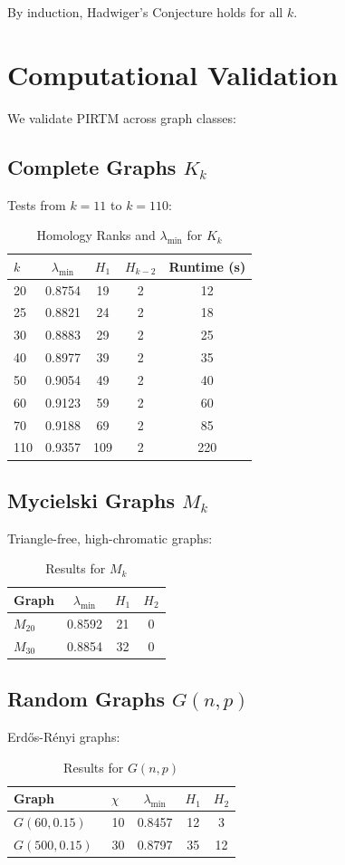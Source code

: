 \documentclass{article}
\theoremstyle{plain}
\begin{document}
By induction, Hadwiger’s Conjecture holds for all $k$.

\section{Computational Validation}
We validate PIRTM across graph classes:
\subsection{Complete Graphs \( K_k \)}
Tests from \( k = 11 \) to \( k = 110 \):
\begin{table}[h]
\caption{Homology Ranks and \( \lambda_{\text{min}} \) for \( K_k \)}
\begin{tabular}{lcccc}
\toprule
\( k \) & \( \lambda_{\text{min}} \) & \( H_1 \) & \( H_{k-2} \) & Runtime (s) \\
\midrule
20 & 0.8754 & 19 & 2 & 12 \\
25 & 0.8821 & 24 & 2 & 18 \\
30 & 0.8883 & 29 & 2 & 25 \\
40 & 0.8977 & 39 & 2 & 35 \\
50 & 0.9054 & 49 & 2 & 40 \\
60 & 0.9123 & 59 & 2 & 60 \\
70 & 0.9188 & 69 & 2 & 85 \\
110 & 0.9357 & 109 & 2 & 220 \\
\bottomrule
\end{tabular}
\end{table}
\subsection{Mycielski Graphs \( M_k \)}
Triangle-free, high-chromatic graphs:
\begin{table}[h]
\caption{Results for \( M_k \)}
\begin{tabular}{lccc}
\toprule
Graph & \( \lambda_{\text{min}} \) & \( H_1 \) & \( H_2 \) \\
\midrule
\( M_{20} \) & 0.8592 & 21 & 0 \\
\( M_{30} \) & 0.8854 & 32 & 0 \\
\bottomrule
\end{tabular}
\end{table}
\subsection{Random Graphs \( G(n, p) \)}
Erdős-Rényi graphs:
\begin{table}[h]
\caption{Results for \( G(n, p) \)}
\begin{tabular}{lcccc}
\toprule
Graph & \( \chi \) & \( \lambda_{\text{min}} \) & \( H_1 \) & \( H_2 \) \\
\midrule
\( G(60, 0.15) \) & ~10 & 0.8457 & 12 & 3 \\
\( G(500, 0.15) \) & ~30 & 0.8797 & 35 & 12 \\
\bottomrule
\end{tabular}
\end{table}
\end{document}
